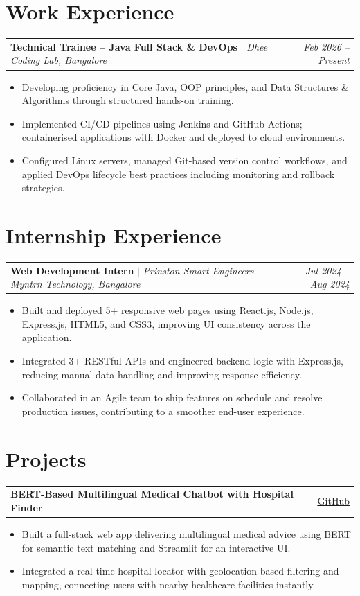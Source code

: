 \documentclass[10pt, a4paper]{article}
\makeatletter
\newcommand{\resumeItem}[1]{%
  \item\small{#1}
}
\newcommand{\jobheading}[4]{%
  \noindent
  \begin{tabularx}{\linewidth}{@{}X r@{}}
    \textbf{#1} $|$ \textit{#2, #3} & \small\textit{#4}
  \end{tabularx}
  \vspace{-2pt}
}
\newcommand{\projectheading}[2]{%
  \noindent
  \begin{tabularx}{\linewidth}{@{}X r@{}}
    \textbf{#1} & \small\href{#2}{\underline{GitHub}}
  \end{tabularx}
  \vspace{-2pt}
}
\newenvironment{itemizeCustom}{%
  \begin{itemize}[leftmargin=12pt, itemsep=1pt, topsep=2pt, parsep=0pt]
}{%
  \end{itemize}
}
\makeatother
\begin{document}
\section{Work Experience}

\jobheading{Technical Trainee – Java Full Stack \& DevOps}{Dhee Coding Lab}{Bangalore}{Feb 2026 – Present}
\begin{itemizeCustom}
  \resumeItem{Developing proficiency in Core Java, OOP principles, and Data Structures \& Algorithms through structured hands-on training.}
  \resumeItem{Implemented CI/CD pipelines using Jenkins and GitHub Actions; containerised applications with Docker and deployed to cloud environments.}
  \resumeItem{Configured Linux servers, managed Git-based version control workflows, and applied DevOps lifecycle best practices including monitoring and rollback strategies.}
\end{itemizeCustom}

\section{Internship Experience}

\jobheading{Web Development Intern}{Prinston Smart Engineers – Myntrn Technology}{Bangalore}{Jul 2024 – Aug 2024}
\begin{itemizeCustom}
  \resumeItem{Built and deployed 5+ responsive web pages using React.js, Node.js, Express.js, HTML5, and CSS3, improving UI consistency across the application.}
  \resumeItem{Integrated 3+ RESTful APIs and engineered backend logic with Express.js, reducing manual data handling and improving response efficiency.}
  \resumeItem{Collaborated in an Agile team to ship features on schedule and resolve production issues, contributing to a smoother end-user experience.}
\end{itemizeCustom}

\section{Projects}

\projectheading{BERT-Based Multilingual Medical Chatbot with Hospital Finder}{https://github.com/manojkumar675}
\begin{itemizeCustom}
  \resumeItem{Built a full-stack web app delivering multilingual medical advice using BERT for semantic text matching and Streamlit for an interactive UI.}
  \resumeItem{Integrated a real-time hospital locator with geolocation-based filtering and mapping, connecting users with nearby healthcare facilities instantly.}
\end{itemizeCustom}
\end{document}
